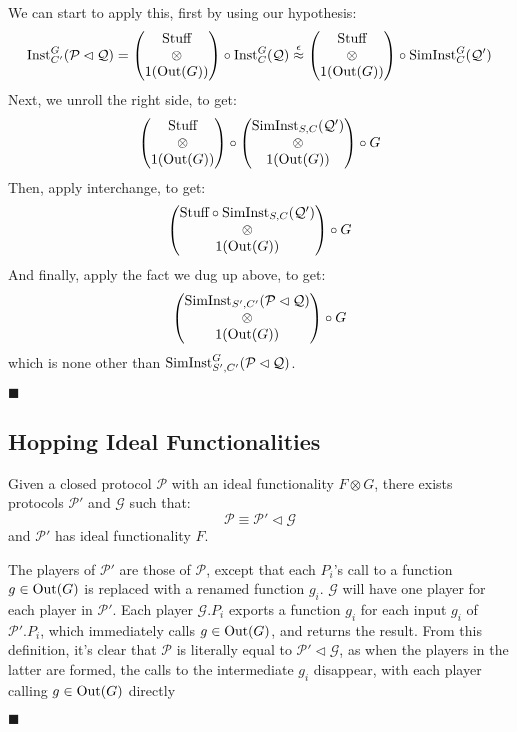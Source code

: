 \begin{theorem}
  We can start to apply this, first by using our hypothesis:
  $$
  \text{Inst}^G_{C'}(\mathcal{P} \lhd \mathcal{Q}) =
  \begin{pmatrix}
    \text{Stuff}\cr
    \otimes\cr
    1(\text{Out}(G))
  \end{pmatrix}
  \circ \text{Inst}^G_C(\mathcal{Q})
  \overset{\epsilon}{\approx}
  \begin{pmatrix}
    \text{Stuff}\cr
    \otimes\cr
    1(\text{Out}(G))
  \end{pmatrix}
  \circ \text{SimInst}^G_C(\mathcal{Q}')
  $$
  Next, we unroll the right side, to get:
  $$
  \begin{pmatrix}
    \text{Stuff}\cr
    \otimes\cr
    1(\text{Out}(G))
  \end{pmatrix}
  \circ
  \begin{pmatrix}
    \text{SimInst}_{S, C}(\mathcal{Q}')\cr
    \otimes\cr
    1(\text{Out}(G))
  \end{pmatrix}
  \circ
  G
  $$
  Then, apply interchange, to get:
  $$
  \begin{pmatrix}
    \text{Stuff} \circ \text{SimInst}_{S, C}(\mathcal{Q}')\cr
    \otimes\cr
    1(\text{Out}(G))
  \end{pmatrix}
  \circ
  G
  $$
  And finally, apply the fact we dug up above, to get:
  $$
  \begin{pmatrix}
    \text{SimInst}_{S', C'}(\mathcal{P} \lhd \mathcal{Q})\cr
    \otimes\cr
    1(\text{Out}(G))
  \end{pmatrix}
  \circ
  G
  $$
  which is none other than $\text{SimInst}^G_{S', C'}(\mathcal{P} \lhd \mathcal{Q})$.

  $\blacksquare$
\end{theorem}

\subsection{Hopping Ideal Functionalities}

\begin{lemma}
  Given a closed protocol $\mathcal{P}$ with an ideal functionality $F \otimes G$,
  there exists protocols $\mathcal{P}'$ and $\mathcal{G}$
  such that:
  $$
  \mathcal{P} \equiv \mathcal{P}' \lhd \mathcal{G}
  $$
  and $\mathcal{P}'$ has ideal functionality $F$.


   The players of $\mathcal{P}'$ are those of $\mathcal{P}$,
  except that each $P_i$'s call to a function $g \in \text{Out}(G)$ is replaced with
  a renamed function $g_i$.
  $\mathcal{G}$ will have one player for each player in $\mathcal{P}'$.
  Each player $\mathcal{G}.P_i$ exports a function $g_i$ for each input
  $g_i$ of $\mathcal{P}'.P_i$, which immediately calls $g \in \text{Out}(G)$,
  and returns the result.
  From this definition, it's clear that $\mathcal{P}$ is literally equal
  to $\mathcal{P}' \lhd \mathcal{G}$, as when the players in the latter
  are formed, the calls to the intermediate $g_i$ disappear,
  with each player calling $g \in \text{Out}(G)$ directly

  $\blacksquare$
\end{lemma}

